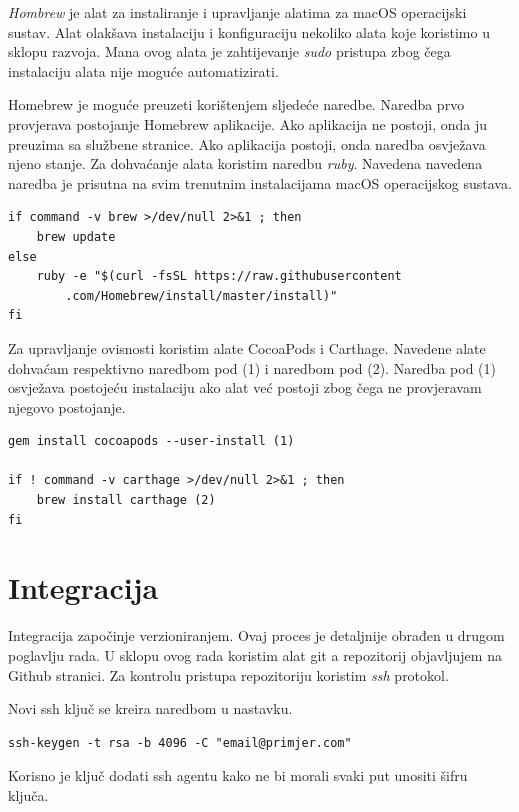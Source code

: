 \documentclass[times, utf8, diplomski, numeric]{fer}
\begin{document}
\begin{appendices}
\textit{Hombrew} je alat za instaliranje i upravljanje alatima za macOS operacijski sustav. Alat olakšava instalaciju i konfiguraciju nekoliko alata koje koristimo u sklopu razvoja. Mana ovog alata je zahtijevanje \textit{sudo} pristupa zbog čega instalaciju alata nije moguće automatizirati.

Homebrew je moguće preuzeti korištenjem sljedeće naredbe. Naredba prvo provjerava postojanje Homebrew aplikacije. Ako aplikacija ne postoji, onda ju preuzima sa službene stranice. Ako aplikacija postoji, onda naredba osvježava njeno stanje. Za dohvaćanje alata koristim naredbu \textit{ruby}. Navedena navedena naredba je prisutna na svim trenutnim instalacijama macOS operacijskog sustava.

\begin{verbatim}
if command -v brew >/dev/null 2>&1 ; then
    brew update
else
    ruby -e "$(curl -fsSL https://raw.githubusercontent
        .com/Homebrew/install/master/install)"
fi
\end{verbatim}

Za upravljanje ovisnosti koristim alate CocoaPods i Carthage. Navedene alate dohvaćam respektivno naredbom pod (1) i naredbom pod (2). Naredba pod (1) osvježava postojeću instalaciju ako alat već postoji zbog čega ne provjeravam njegovo postojanje.

\begin{verbatim}
gem install cocoapods --user-install (1)

if ! command -v carthage >/dev/null 2>&1 ; then
    brew install carthage (2)
fi
\end{verbatim}


\section{Integracija}

Integracija započinje verzioniranjem. Ovaj proces je detaljnije obrađen u drugom poglavlju rada. U sklopu ovog rada koristim alat git a repozitorij objavljujem na Github stranici. Za kontrolu pristupa repozitoriju koristim \textit{ssh} protokol.

Novi ssh ključ se kreira naredbom u nastavku.

\begin{verbatim}
ssh-keygen -t rsa -b 4096 -C "email@primjer.com"
\end{verbatim}

Korisno je ključ dodati ssh agentu kako ne bi morali svaki put unositi šifru ključa.


\end{appendices}
\end{document}
